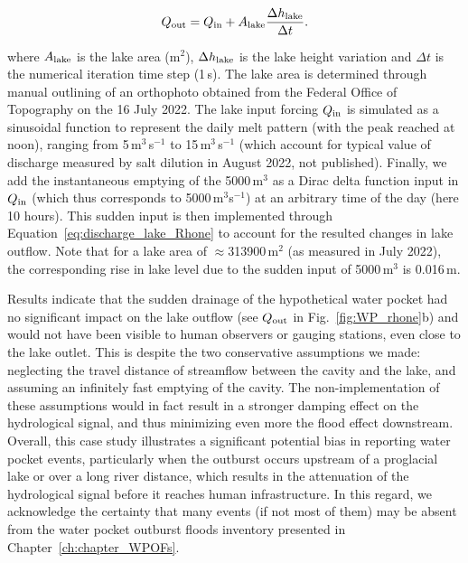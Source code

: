 \begin{equation}
  \label{eq:discharge_lake_Rhone}
Q_{\rm out} = Q_{\rm in} + A_{\rm lake}\frac{\Delta h_{\rm lake}}{\Delta t}.
\end{equation}

where $A_{\rm lake}$ is the lake area (m$^2$), $\Delta h_{\rm lake}$ is the lake height variation and $\Delta t$ is the numerical iteration time step (1\,s). The lake area is determined through manual outlining of an orthophoto obtained from the Federal Office of Topography on the 16 July 2022. The lake input forcing $Q_{\rm in}$ is simulated as a sinusoidal function to represent the daily melt pattern (with the peak reached at noon), ranging from 5\,m$^3$\,s$^{-1}$ to 15\,m$^3$\,s$^{-1}$ (which account for typical value of discharge measured by salt dilution in August 2022, not published).
Finally, we add the instantaneous emptying of the 5000\,m$^3$ as a Dirac delta function input in $Q_{\rm in}$ (which thus corresponds to 5000\,m$^3$s$^{-1}$) at an arbitrary time of the day (here 10 hours). This sudden input is then implemented through Equation~\ref{eq:discharge_lake_Rhone} to account for the resulted changes in lake outflow. Note that for a lake area of $\approx$313900\,m$^2$ (as measured in July 2022), the corresponding rise in lake level due to the sudden input of 5000\,m$^3$ is 0.016\,m.

Results indicate that the sudden drainage of the hypothetical water pocket had no significant impact on the lake outflow (see $Q_{\rm out}$ in Fig.~\ref{fig:WP_rhone}b) and would not have been visible to human observers or gauging stations, even close to the lake outlet. This is despite the two conservative assumptions we made: neglecting the travel distance of streamflow between the cavity and the lake, and assuming an infinitely fast emptying of the cavity. The non-implementation of these assumptions would in fact result in a stronger damping effect on the hydrological signal, and thus minimizing even more the flood effect downstream. 
Overall, this case study illustrates a significant potential bias in reporting water pocket events, particularly when the outburst occurs upstream of a proglacial lake or over a long river distance, which results in the attenuation of the hydrological signal before it reaches human infrastructure. In this regard, we acknowledge the certainty that many events (if not most of them) may be absent from the water pocket outburst floods inventory presented in Chapter~\ref{ch:chapter_WPOFs}. 



